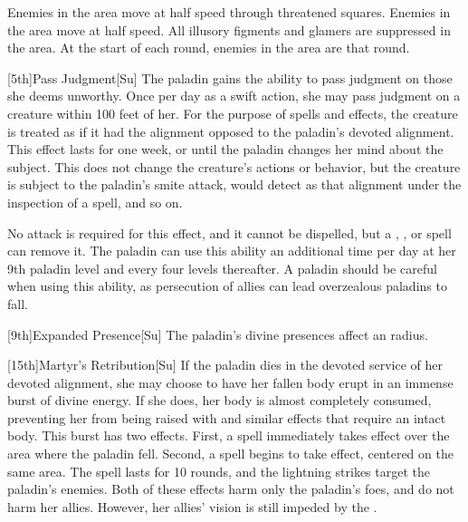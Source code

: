         Enemies in the area move at half speed through threatened squares.
        Enemies in the area move at half speed.
        All illusory figments and glamers are suppressed in the area.
        At the start of each round, enemies in the area are \immobilized that round.

        [5th]{Pass Judgment}[Su]
        The paladin gains the ability to pass judgment on those she deems unworthy.
        Once per day as a swift action, she may pass judgment on a creature within 100 feet of her.
        For the purpose of spells and effects, the creature is treated as if it had the alignment opposed to the paladin's devoted alignment.
        This effect lasts for one week, or until the paladin changes her mind about the subject.
        This does not change the creature's actions or behavior, but the creature is subject to the paladin's smite attack, would detect as that alignment under the inspection of a  spell, and so on.

        No attack is required for this effect, and it cannot be dispelled, but a , , or  spell can remove it.
        The paladin can use this ability an additional time per day at her 9th paladin level and every four levels thereafter.
        A paladin should be careful when using this ability, as persecution of allies can lead overzealous paladins to fall.

        [9th]{Expanded Presence}[Su]
        The paladin's divine presences affect an \arealarge radius.

        [15th]{Martyr's Retribution}[Su]
        If the paladin dies in the devoted service of her devoted alignment, she may choose to have her fallen body erupt in an immense burst of divine energy.
        If she does, her body is almost completely consumed, preventing her from being raised with  and similar effects that require an intact body.
        This burst has two effects.
        First, a  spell immediately takes effect over the area where the paladin fell.
        Second, a  spell begins to take effect, centered on the same area.
        The spell lasts for 10 rounds, and the lightning strikes target the paladin's enemies.
        Both of these effects harm only the paladin's foes, and do not harm her allies.
        However, her allies' vision is still impeded by the .

